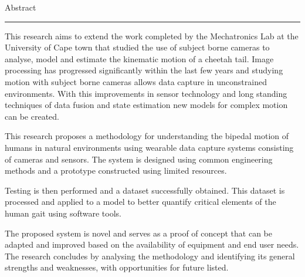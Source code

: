 \pagestyle{plain}


{\Large Abstract}
\vskip 5mm
\hrule
\vskip 5mm

This research aims to extend the work completed by the Mechatronics Lab at the University of Cape town that studied the use of subject borne cameras to analyse, model and estimate the kinematic motion of a cheetah tail. Image processing has progressed significantly within the last few years and studying motion with subject borne cameras allows data capture in unconstrained environments. With this improvements in sensor technology and long standing techniques of data fusion and state estimation new models for complex motion can be created.

This research proposes a methodology for understanding the bipedal motion of humans in natural environments using wearable data capture systems consisting of cameras and sensors. The system is designed using common engineering methods and a prototype constructed using limited resources. 

Testing is then performed and a dataset successfully obtained. This dataset is processed and applied to a model to better quantify critical elements of the human gait using software tools.   

The proposed system is novel and serves as a proof of concept that can be adapted and improved based on the availability of equipment and end user needs. The research concludes by analysing the methodology and identifying its general strengths and weaknesses, with opportunities for future listed. 

